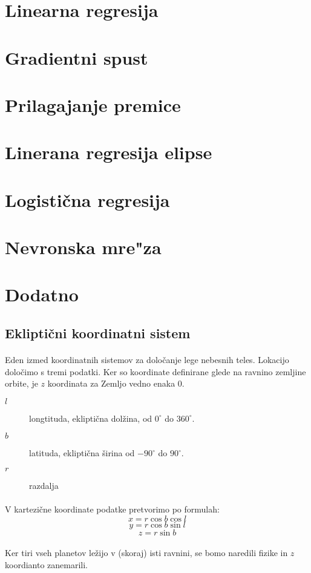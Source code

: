 \documentclass[a4paper, 12pt]{article}
\begin{document}
	\section*{Linearna regresija}
	

	\section*{Gradientni spust}
	
	
	\section*{Prilagajanje premice}
	

	\section*{Linerana regresija elipse}
	
	
	\section*{Logistična regresija}
	
	
	\section*{Nevronska mre"za}
	

	\section*{Dodatno}
	\subsection*{Ekliptični koordinatni sistem}
	\paragraph{}
	Eden izmed koordinatnih sistemov za določanje lege nebesnih teles. Lokacijo določimo s tremi podatki. Ker so koordinate definirane glede na ravnino zemljine orbite, je $z$ koordinata za Zemljo vedno enaka 0.
	\begin{description}
		\item[$l$] longtituda, ekliptična dolžina, od $0^\circ$ do $360^\circ$.
		\item[$b$] latituda, ekliptična širina od $-90^\circ$ do $90^\circ$.
		\item[$r$] razdalja
	\end{description}

	\paragraph{}
	V kartezične koordinate podatke pretvorimo po formulah:
	$$x = r \cos b \cos l$$
	$$y = r \cos b \sin l$$
	$$z = r \sin b$$

	\paragraph{}
	Ker tiri vseh planetov ležijo v (skoraj) isti ravnini, se bomo naredili fizike in $z$ koordianto zanemarili.
\end{document}
